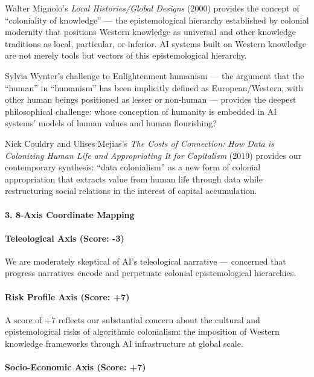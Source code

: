 Walter Mignolo's \emph{Local Histories/Global Designs} (2000) provides
the concept of ``coloniality of knowledge'' --- the epistemological
hierarchy established by colonial modernity that positions Western
knowledge as universal and other knowledge traditions as local,
particular, or inferior. AI systems built on Western knowledge are not
merely tools but vectors of this epistemological hierarchy.

Sylvia Wynter's challenge to Enlightenment humanism --- the argument
that the ``human'' in ``humanism'' has been implicitly defined as
European/Western, with other human beings positioned as lesser or
non-human --- provides the deepest philosophical challenge: whose
conception of humanity is embedded in AI systems' models of human values
and human flourishing?

Nick Couldry and Ulises Mejias's \emph{The Costs of Connection: How Data
is Colonizing Human Life and Appropriating It for Capitalism} (2019)
provides our contemporary synthesis: ``data colonialism'' as a new form
of colonial appropriation that extracts value from human life through
data while restructuring social relations in the interest of capital
accumulation.

\paragraph{3. 8-Axis Coordinate
Mapping}\label{axis-coordinate-mapping-47}

\paragraph{Teleological Axis (Score:
-3)}\label{teleological-axis-score--3-1}

We are moderately skeptical of AI's teleological narrative --- concerned
that progress narratives encode and perpetuate colonial epistemological
hierarchies.

\paragraph{Risk Profile Axis (Score:
+7)}\label{risk-profile-axis-score-7-5}

A score of +7 reflects our substantial concern about the cultural and
epistemological risks of algorithmic colonialism: the imposition of
Western knowledge frameworks through AI infrastructure at global scale.

\paragraph{Socio-Economic Axis (Score:
+7)}\label{socio-economic-axis-score-7-3}


